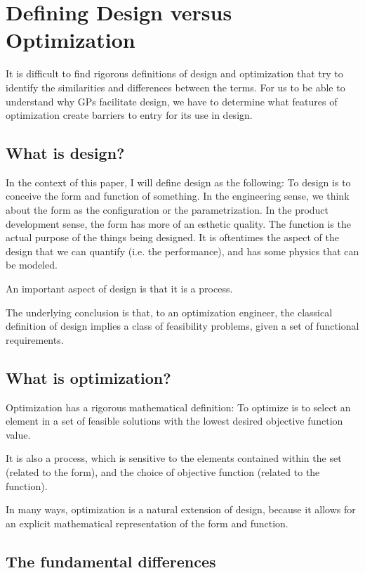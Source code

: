 \section{Defining Design versus Optimization} \label{s:DesVsOpt}

It is difficult to find rigorous definitions of design and optimization that
try to identify the similarities and differences between the terms. For us to be
able to understand why \gls{GP}s facilitate design, we have to determine what 
features of optimization create barriers to entry for its use in design. 

\subsection{What is design?}

In the context of this paper, I will define design as the following:
	To design is to conceive the form and function of something. 
In the engineering sense, we think about the form as the configuration or
the parametrization. 
In the product development sense, the form has more of an esthetic quality. 
The function is the actual purpose of the things being designed. It is oftentimes 
the aspect of the design that we can quantify (i.e. the performance), and has some 
physics that can be modeled. 

An important aspect of design is that it is a process. 

The underlying conclusion is that, to an optimization engineer, the classical 
definition of design implies a class of feasibility problems, given a set
of functional requirements. 

\subsection{What is optimization?}

Optimization has a rigorous mathematical definition: To optimize is to select an 
element in a set of feasible solutions with the lowest desired objective
function value. 

It is also a process, which is sensitive to the elements contained within the set
(related to the form), and the choice of objective function (related to the 
function).

In many ways, optimization is a natural extension of design, because it allows 
for an explicit mathematical representation of the form and function.

\subsection{The fundamental differences}

